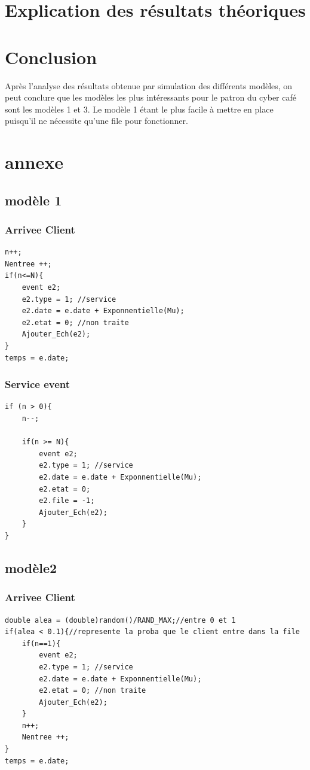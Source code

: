 \documentclass[a4paper,11pt]{article}
\begin{document}
\section{Explication des résultats théoriques}
	
\section{Conclusion}
	Après l'analyse des résultats obtenue par simulation des différents modèles, on peut conclure que les modèles les plus intéressants pour le patron du cyber café sont les modèles 1 et 3. Le modèle 1 étant le plus facile à mettre en place puisqu'il ne nécessite qu'une file pour fonctionner.
	
\section{annexe}
\label{annexe}
	\subsection{modèle 1}
		\subsubsection{Arrivee Client}
	\begin{lstlisting}
n++; 
Nentree ++; 
if(n<=N){
	event e2;
	e2.type = 1; //service
	e2.date = e.date + Exponnentielle(Mu);
	e2.etat = 0; //non traite
	Ajouter_Ech(e2);
}
temps = e.date;
	\end{lstlisting}
		\subsubsection{Service event}
	\begin{lstlisting}
if (n > 0){
	n--;

	if(n >= N){
		event e2;
		e2.type = 1; //service
		e2.date = e.date + Exponnentielle(Mu);
		e2.etat = 0;
		e2.file = -1;
		Ajouter_Ech(e2);
	}
}
	\end{lstlisting}
	\subsection{modèle2}
		\subsubsection{Arrivee Client}
			\begin{lstlisting}
double alea = (double)random()/RAND_MAX;//entre 0 et 1
if(alea < 0.1){//represente la proba que le client entre dans la file
	if(n==1){
		event e2;
		e2.type = 1; //service
		e2.date = e.date + Exponnentielle(Mu);
		e2.etat = 0; //non traite
		Ajouter_Ech(e2);
	}
	n++;
	Nentree ++;
}
temps = e.date;
			\end{lstlisting}
\end{document}
